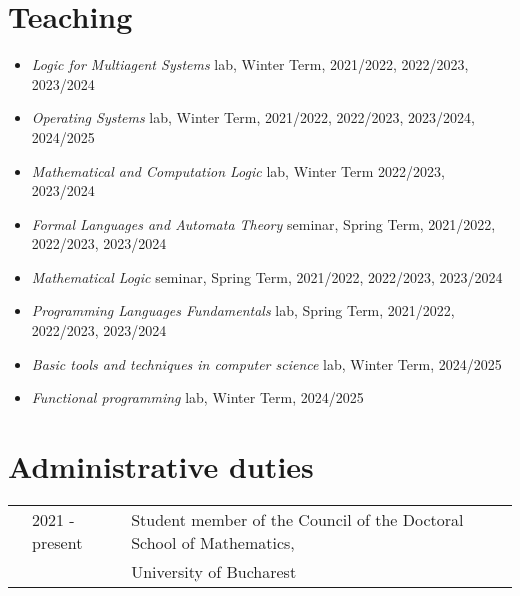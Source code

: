 \documentclass[letterpaper,11pt,oneside]{article}
\begin{document}
\noindent
\section{Teaching}
\normalsize
\begin{itemize}
    \item \textit{Logic for Multiagent Systems} lab, Winter Term, 2021/2022, 2022/2023, 2023/2024
    \item \textit{Operating Systems} lab, Winter Term, 2021/2022, 2022/2023, 2023/2024, 2024/2025
    \item \textit{Mathematical and Computation Logic} lab, Winter Term 2022/2023, 2023/2024
    \item \textit{Formal Languages and Automata Theory} seminar, Spring Term, 2021/2022, 2022/2023, 2023/2024 
    \item \textit{Mathematical Logic} seminar, Spring Term, 2021/2022, 2022/2023, 2023/2024 
    \item \textit{Programming Languages Fundamentals} lab, Spring Term, 2021/2022, 2022/2023, 2023/2024 
    \item \textit{Basic tools and techniques in computer science} lab, Winter Term, 2024/2025 
    \item \textit{Functional programming} lab, Winter Term, 2024/2025
\end{itemize}
\mbox{}


\noindent
\section{Administrative duties}
\normalsize
\begin{tabular}{@{} l l l}
    & 2021 - present & Student member of the Council of the Doctoral School of Mathematics, \\ 
    &                & University of Bucharest
\end{tabular}
\mbox{}\\[10mm]







\end{document}
